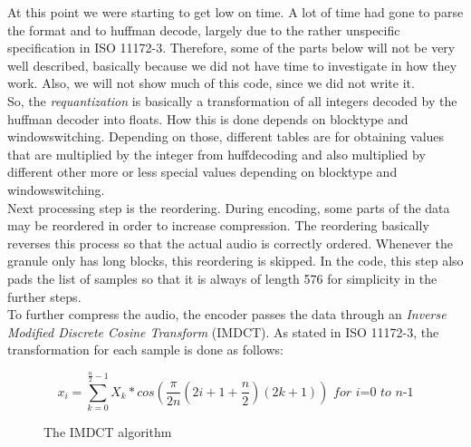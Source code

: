 \documentclass[a4paper,12pt]{article}
\begin{document}
        At this point we were starting to get low on time. A lot of time had
        gone to parse the format and to huffman decode, largely due to the
        rather unspecific specification in ISO 11172-3. Therefore, some of the
        parts below will not be very well described, basically because we did
        not have time to investigate in how they work. Also, we will not show
        much of this code, since we did not write it. \\

        So, the \textit{requantization} is basically a transformation of all
        integers decoded by the huffman decoder into floats. How this is done
        depends on blocktype and windowswitching. Depending on those, different
        tables are for obtaining values that are multiplied by the integer from
        huffdecoding and also multiplied by different other more or less special
        values depending on blocktype and windowswitching. \\

        Next processing step is the reordering. During encoding, some parts of
        the data may be reordered in order to increase compression. The
        reordering basically reverses this process so that the actual audio is
        correctly ordered. Whenever the granule only has long blocks, this
        reordering is skipped. In the code, this step also pads the list of
        samples so that it is always of length 576 for simplicity in the further
        steps. \\

        To further compress the audio, the encoder passes the data through an
        \textit{Inverse Modified Discrete Cosine Transform} (IMDCT). As stated
        in ISO 11172-3, the transformation for each sample is done as
        follows:
\begin{figure}[h]
  \begin{center}
        \[
            x_i = \sum_{k=0}^{\frac{n}{2} - 1}{X_k * cos(\frac{\pi}{2n}(2i + 1 +
                  \frac{n}{2})(2k + 1))}
            \textit{ for i=0 to n-1}
        \]
    \caption{The IMDCT algorithm}\label{fig:imdctalgo}
  \end{center}
\end{figure}
\end{document}
